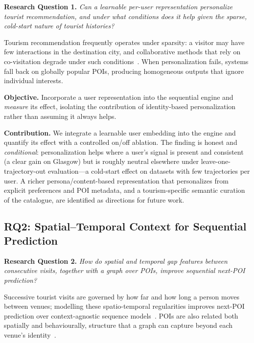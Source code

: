 \textbf{Research Question 1.} \textit{Can a learnable per-user representation personalize tourist recommendation, and under what conditions does it help given the sparse, cold-start nature of tourist histories?}

\medskip

Tourism recommendation frequently operates under sparsity: a visitor may have few interactions in the destination city, and collaborative methods that rely on co-visitation degrade under such conditions~\cite{koren2009mf}. When personalization fails, systems fall back on globally popular POIs, producing homogeneous outputs that ignore individual interests.

\textbf{Objective.} Incorporate a user representation into the sequential engine and \emph{measure} its effect, isolating the contribution of identity-based personalization rather than assuming it always helps.

\textbf{Contribution.} We integrate a learnable user embedding into the engine and quantify its effect with a controlled on/off ablation. The finding is honest and \emph{conditional}: personalization helps where a user's signal is present and consistent (a clear gain on Glasgow) but is roughly neutral elsewhere under leave-one-trajectory-out evaluation---a cold-start effect on datasets with few trajectories per user. A richer persona/content-based representation that personalizes from explicit preferences and POI metadata, and a tourism-specific semantic curation of the catalogue, are identified as directions for future work.

\subsection{RQ2: Spatial--Temporal Context for Sequential Prediction}
\label{sec:intro-rq2}

\textbf{Research Question 2.} \textit{How do spatial and temporal gap features between consecutive visits, together with a graph over POIs, improve sequential next-POI prediction?}

\medskip

Successive tourist visits are governed by how far and how long a person moves between venues; modelling these spatio-temporal regularities improves next-POI prediction over context-agnostic sequence models~\cite{liu2016strnn}. POIs are also related both spatially and behaviourally, structure that a graph can capture beyond each venue's identity~\cite{adomavicius2005cars, adomavicius2022cars}.

